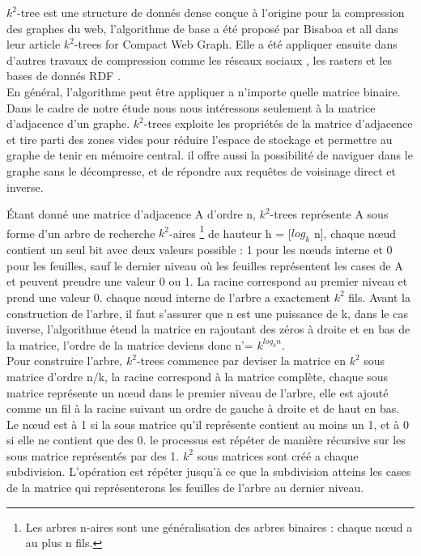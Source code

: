 $k^2$-tree est une structure de donnés dense conçue à l'origine pour la compression des graphes du web, l'algorithme de base a été proposé par Bisaboa et all dans leur article $k^2$-trees for Compact Web Graph. \citep{brisaboa2009k} Elle a été appliquer ensuite dans d'autres travaux de compression comme les réseaux sociaux \citep{shi2012optimizing}, les rasters \citep{de2013compact} et les bases de donnés RDF \citep{alvarez2017succinct}.\\
  
En général, l'algorithme peut être appliquer a n'importe quelle matrice binaire. Dans le cadre de notre étude nous nous intéressons seulement à la matrice d'adjacence d'un graphe.
$k^2$-trees exploite les propriétés de la matrice d'adjacence et tire parti des zones vides pour réduire l'espace de stockage et permettre au graphe de tenir en mémoire central. il offre aussi la possibilité de naviguer dans le graphe sans le décompresse, et de répondre aux requêtes de voisinage direct et inverse.

Étant donné une matrice d'adjacence A d'ordre n, $k^2$-trees représente A sous forme d'un arbre de recherche $k^2$-aires \footnote{Les arbres n-aires sont une généralisation des arbres binaires : chaque nœud a au plus n fils.} de hauteur h = [$log_{k}$ n], chaque nœud contient un seul bit avec deux valeurs possible : 1 pour les nœuds interne et 0 pour les feuilles, sauf le dernier niveau où les feuilles représentent les cases de A et peuvent prendre une valeur 0 ou 1. La racine correspond au premier niveau et prend une valeur 0. chaque nœud interne de l'arbre a exactement $k^2$ fils.  
Avant la construction de l'arbre, il faut s'assurer que n est une puissance de k, dans le cas inverse, l'algorithme étend la matrice en rajoutant des zéros à droite et en bas de la matrice, l'ordre de la matrice deviens donc n'= $k^{log_{k} n}$.\\

Pour construire l'arbre, $k^2$-trees commence par deviser la matrice en $k^{2}$ sous matrice d'ordre n/k, la racine correspond à la matrice complète, chaque sous matrice représente un nœud dans le premier niveau de l'arbre, elle est ajouté comme un fil à la racine suivant un ordre de gauche à droite et de haut en bas. Le nœud est à 1 si la sous matrice qu'il représente contient au moins un 1, et à 0 si elle ne contient que des 0. le processus est répéter de manière récursive sur les sous matrice représentés par des 1. $k^{2}$ sous matrices sont créé a chaque subdivision. L'opération est répéter jusqu'à ce que la subdivision atteins les cases de la matrice qui représenterons les feuilles de l'arbre au dernier niveau. 

